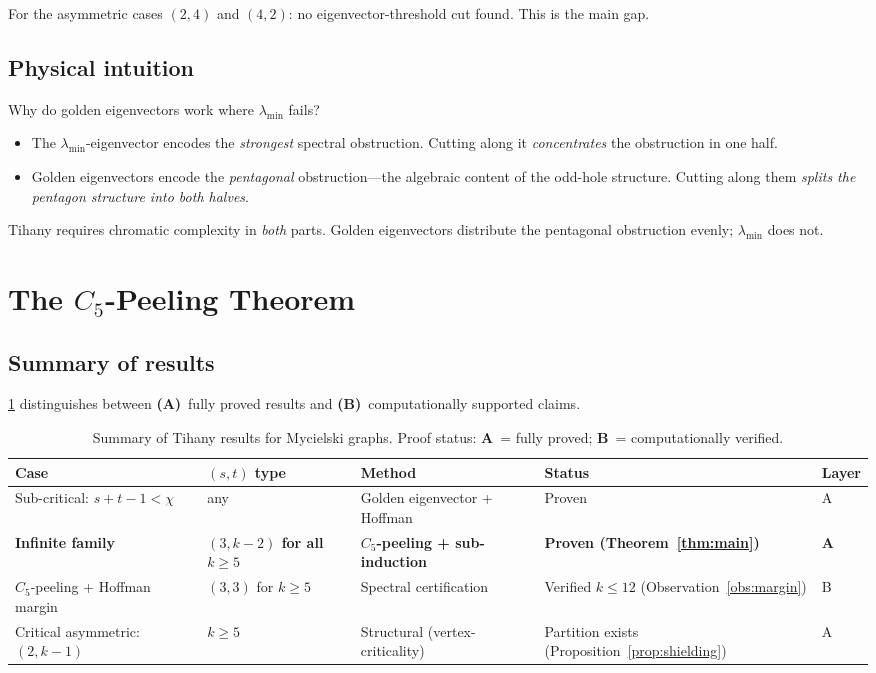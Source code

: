 \documentclass[11pt,a4paper]{amsart}
\theoremstyle{plain}
\theoremstyle{definition}
\theoremstyle{remark}
\newcommand{\chr}{\chi}
\begin{document}
For the asymmetric cases $(2,4)$ and $(4,2)$: no eigenvector-threshold cut
found.  This is the main gap.

\subsection{Physical intuition}

Why do golden eigenvectors work where $\lambda_{\min}$ fails?
\begin{itemize}
\item The $\lambda_{\min}$-eigenvector encodes the \emph{strongest} spectral
  obstruction.  Cutting along it \emph{concentrates} the obstruction in one
  half.
\item Golden eigenvectors encode the \emph{pentagonal} obstruction---the
  algebraic content of the odd-hole structure.  Cutting along them \emph{splits
  the pentagon structure into both halves}.
\end{itemize}
Tihany requires chromatic complexity in \emph{both} parts.  Golden eigenvectors
distribute the pentagonal obstruction evenly; $\lambda_{\min}$ does not.

\section{The \texorpdfstring{$C_5$}{C₅}-Peeling Theorem}\label{sec:peeling}

\subsection{Summary of results}

\cref{tab:summary} distinguishes between \textbf{(A)}~fully proved results
and \textbf{(B)}~computationally supported claims.

\begin{table}[ht]
\centering
\caption{Summary of Tihany results for Mycielski graphs. Proof status:
\textbf{A}~= fully proved; \textbf{B}~= computationally verified.}
\label{tab:summary}
\begin{tabular}{@{}lllll@{}}
\toprule
Case & $(s,t)$ type & Method & Status & Layer \\
\midrule
Sub-critical: $s{+}t{-}1 < \chr$
  & any
  & Golden eigenvector + Hoffman
  & Proven
  & A \\
\textbf{Infinite family}
  & \textbf{$(3,k{-}2)$ for all $k\geq 5$}
  & \textbf{$C_5$-peeling + sub-induction}
  & \textbf{Proven (Theorem~\ref{thm:main})}
  & \textbf{A} \\
$C_5$-peeling + Hoffman margin
  & $(3,3)$ for $k\geq 5$
  & Spectral certification
  & Verified $k\leq 12$ (Observation~\ref{obs:margin})
  & B \\
Critical asymmetric: $(2,k{-}1)$
  & $k\geq 5$
  & Structural (vertex-criticality)
  & Partition exists (Proposition~\ref{prop:shielding})
  & A \\
\bottomrule
\end{tabular}
\end{table}
\end{document}
